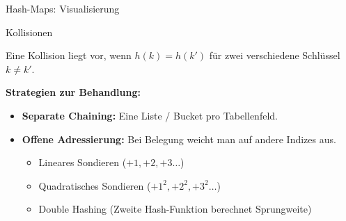 \documentclass[aspectratio=169,11pt]{beamer}
\begin{document}
\begin{frame}{Hash-Maps: Visualisierung}
    \begin{center}
    \end{center}
\end{frame}

\begin{frame}{Kollisionen}
    \begin{tcolorbox}[alertbox, title=Kollision]
        Eine Kollision liegt vor, wenn $h(k) = h(k')$ für zwei verschiedene Schlüssel $k \neq k'$.
    \end{tcolorbox}
    
    \textbf{Strategien zur Behandlung:}
    \begin{itemize}
        \item \textbf{Separate Chaining:} Eine Liste / Bucket pro Tabellenfeld.
        \item \textbf{Offene Adressierung:} Bei Belegung weicht man auf andere Indizes aus.
        \begin{itemize}
            \item Lineares Sondieren ($+1, +2, +3 \dots$)
            \item Quadratisches Sondieren ($+1^2, +2^2, +3^2 \dots$)
            \item Double Hashing (Zweite Hash-Funktion berechnet Sprungweite)
        \end{itemize}
    \end{itemize}
\end{frame}
\end{document}
